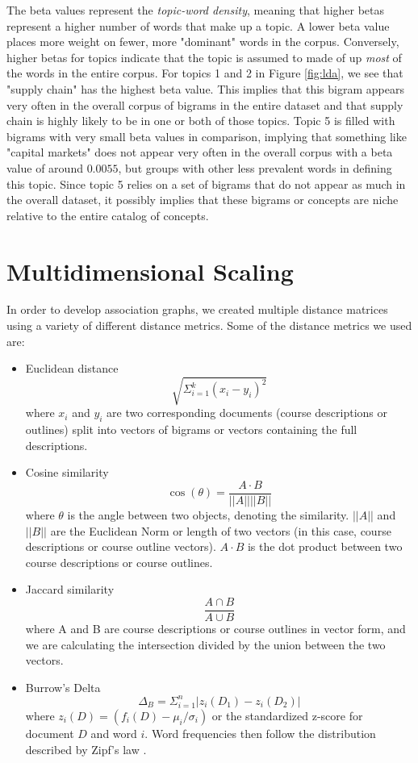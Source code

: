 The beta values represent the \textit{topic-word density}, meaning that higher betas represent a higher number of words that make up a topic.  A lower beta value 
places more weight on fewer, more "dominant" words in the corpus.  Conversely,  higher betas for topics indicate that the topic is assumed to made of up \textit{most} 
of the words in the entire corpus.  For topics 1 and 2 in Figure \ref{fig:lda}, we see that "supply chain" has the highest beta value. This implies that this bigram 
appears very often in the overall corpus of bigrams in the entire dataset and that supply chain is highly likely to be in one or both of those topics.  Topic 5 is 
filled with bigrams with very small beta values in comparison,  implying that something like "capital markets" does not appear very often in the overall corpus 
with a beta value of around $0.0055$,  but groups with other less prevalent words in defining this topic.  Since topic 5 relies on a set of bigrams that do not 
appear as much in the overall dataset, it possibly implies that these bigrams or concepts are niche relative to the entire catalog of concepts.


\section{Multidimensional Scaling}

In order to develop association graphs, we created multiple distance matrices using a variety of different distance metrics.  Some of the distance metrics we used are: 
\begin{itemize}
\item Euclidean distance  
$$\sqrt{\Sigma_{i = 1}^{k}(x_i - y_i)^2}$$
where $x_i$ and $y_i$ are two corresponding documents (course descriptions or outlines) split into vectors of bigrams or vectors containing the full descriptions.
\item Cosine similarity
$$ \cos (\theta) = \frac{A \cdot B}{|| A || || B||}$$
where $\theta$ is the angle between two objects, denoting the similarity.  $||A||$ and $||B||$ are the Euclidean Norm or length of two vectors (in this case, 
course descriptions or course outline vectors). $A \cdot B$ is the dot product  between two course descriptions or course outlines. 
\item Jaccard similarity  
$$\frac{A \cap B}{A \cup B}$$
where A and B are course descriptions or course outlines in vector form, and we are calculating the intersection divided by the union between the two vectors.
\item Burrow's Delta  \cite{burrow}
$$\Delta_B = \Sigma_{i = 1}^n | z_i(D_1) - z_i(D_2)|$$
where $z_i(D) = (f_i(D) - \mu_i/\sigma_i)$ or the standardized z-score for document $D$ and word $i$.  Word frequencies then follow the distribution described 
by Zipf's law \cite{zipf2013psycho}. 

\end{itemize} 

